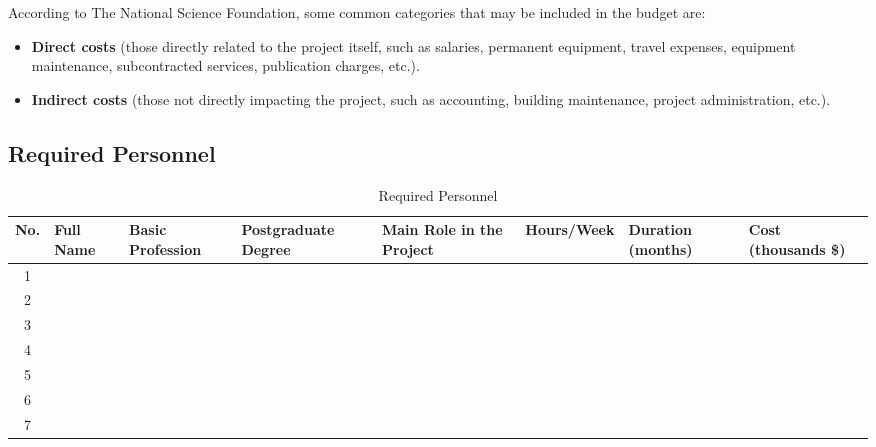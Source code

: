 According to The National Science Foundation\cite{NSF2014}, some common categories that may be included in the budget are:

\begin{itemize}
	\item \textbf{Direct costs} (those directly related to the project itself, such as salaries, permanent equipment, travel expenses, equipment maintenance, subcontracted services, publication charges, etc.).
	\item \textbf{Indirect costs} (those not directly impacting the project, such as accounting, building maintenance, project administration, etc.).
\end{itemize}


\subsection{Required Personnel}

\begin{table}[h]
	\centering
	\scriptsize %
	\renewcommand{\arraystretch}{1.5}
	\setlength{\tabcolsep}{5pt}
	\begin{tabular}{|c|m{3cm}|m{2cm}|m{2cm}|m{1.5cm}|m{1.5cm}|m{1.5cm}|m{1.5cm}|}
		\hline
		\textbf{No.} & \textbf{Full Name} & \textbf{Basic Profession} & \textbf{Postgraduate Degree} & \textbf{Main Role in the Project} & \textbf{Hours/Week} & \textbf{Duration (months)} & \textbf{Cost (thousands \$)} \\
		\hline
		1 &  & & & & & & \\
		\hline
		2 & & & & & & & \\
		\hline
		3 & & & & & & & \\
		\hline
		4 & & & & & & & \\
		\hline
		5 & & & & & & & \\
		\hline
		6 & & & & & & & \\
		\hline
		7 & & & & & & & \\
		\hline
	\end{tabular}
	\caption{Required Personnel}
\end{table}

\newpage
